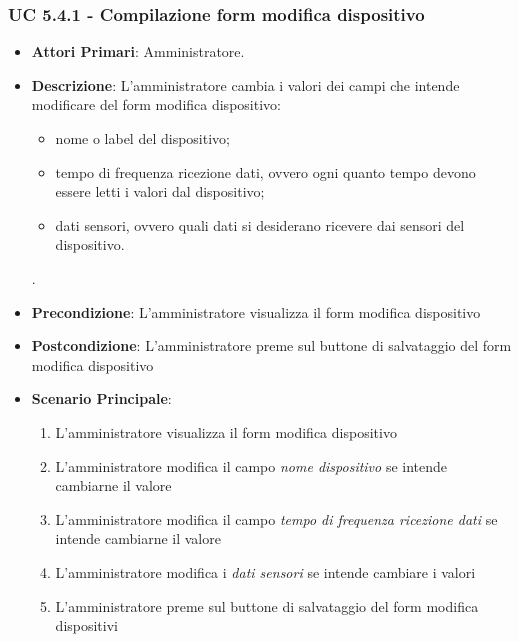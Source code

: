 			\subsubsection{UC 5.4.1 - Compilazione form modifica dispositivo}
			\begin{itemize}
				\item \textbf{Attori Primari}: Amministratore.
				\item \textbf{Descrizione}: L'amministratore cambia i valori dei campi che intende modificare del form modifica dispositivo:
				\begin{itemize}
					\item nome o label del dispositivo;
					\item tempo di frequenza ricezione dati, ovvero ogni quanto tempo devono essere letti i valori dal dispositivo;
					\item dati sensori, ovvero quali dati si desiderano ricevere dai sensori del dispositivo.
				\end{itemize}.
				\item \textbf{Precondizione}: L'amministratore visualizza il form modifica dispositivo
				\item \textbf{Postcondizione}: L'amministratore preme sul buttone di salvataggio del form modifica dispositivo
				\item \textbf{Scenario Principale}:
				\begin{enumerate}
					\item{L'amministratore visualizza il form modifica dispositivo}
					\item{L'amministratore modifica il campo \textit{nome dispositivo} se intende cambiarne il valore}
					\item{L'amministratore modifica il campo \textit{tempo di frequenza ricezione dati} se intende cambiarne il valore}
					\item{L'amministratore modifica i \textit{dati sensori} se intende cambiare i valori}
					\item{L'amministratore preme sul buttone di salvataggio del form modifica dispositivi}
				\end{enumerate}
			\end{itemize}
			
